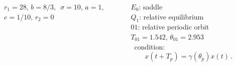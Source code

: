 \documentclass{beamer}
\begin{document}
\begin{frame}
  \begin{columns}[t]
	\begin{block}{}
	\begin{center}
	\end{center}
	\end{block}
	\begin{block}{ }
	 ${r_1=28,}\, {b=8/3,}\,$ ${\sigma=10,}\, {a=1,}\,$ ${e=1/10,}\, {r_2=0}$
	\end{block}
	\begin{block}{ }
	  $E_0$: saddle\\
	  $Q_1$: relative equilibrium\\ 
	  $01$:  relative periodic orbit $T_{01}=1.542,\, \theta_{01}=2.953$\\
		\vspace{12pt}
		\Rpo\ condition:
		\[
 	x(t+T_p)=\gamma(\theta_p) x(t)\,.
		\]
	\end{block}
   \end{columns}
\end{frame}
\end{document}
